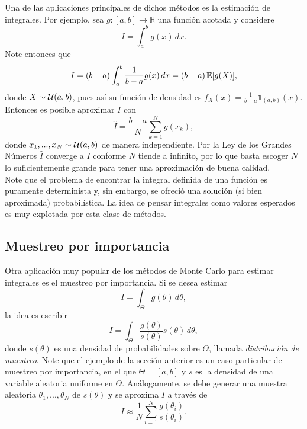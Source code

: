 Una de las aplicaciones principales de dichos métodos es la estimación de integrales. Por ejemplo, sea $g: [a, b] \to \mathbb{R}$ una función acotada y considere
\begin{equation*}
	I = \int_{a}^{b} g(x) \, dx.
\end{equation*}
Note entonces que
\begin{equation*}
	I = (b-a) \int_{a}^{b} \frac{1}{b-a} g(x) \, dx = (b-a) \, \mathbb{E}[g(X)],
\end{equation*}
donde $X \sim \mathcal{U}(a, b)$, pues así su función de densidad es $f_X(x) = \frac{1}{b-a} \mathds{1}_{(a,b)}(x)$. Entonces es posible aproximar $I$ con
\begin{equation*}
	\hat{I} = \frac{b-a}{N} \sum_{k=1}^{N} g(x_k),
\end{equation*}
donde $x_1, ..., x_N \sim \mathcal{U}(a,b)$ de manera independiente. Por la Ley de los Grandes Números $\hat{I}$ converge a $I$ conforme $N$ tiende a infinito, por lo que basta escoger $N$ lo suficientemente grande para tener una aproximación de buena calidad. \\



Note que el problema de encontrar la integral definida de una función es puramente determinista y, sin embargo, se ofreció una solución (si bien aproximada) probabilística. La idea de pensar integrales como valores esperados es muy explotada por esta clase de métodos.



\subsection{Muestreo por importancia}



Otra aplicación muy popular de los métodos de Monte Carlo para estimar integrales es el muestreo por importancia. Si se desea estimar
\begin{equation*}
	I = \int_{\Theta} g(\theta) \, d\theta,
\end{equation*}
la idea es escribir
\begin{equation*}
	I = \int_{\Theta} \frac{ g(\theta) }{ s(\theta) } s(\theta) \, d\theta,
\end{equation*}
donde $s(\theta)$ es una densidad de probabilidades sobre $\Theta$, llamada \textit{distribución de muestreo}. Note que el ejemplo de la sección anterior es un caso particular de muestreo por importancia, en el que $\Theta = [a,b]$ y $s$ es la densidad de una variable aleatoria uniforme en $\Theta$. Análogamente, se debe generar una muestra aleatoria $\theta_1, ..., \theta_N$ de $s(\theta)$ y se aproxima $I$ a través de
\begin{equation*}
	I \approx \frac{1}{N} \sum_{i=1}^{N} \frac{ g(\theta_i) }{ s(\theta_i) }.
\end{equation*}



